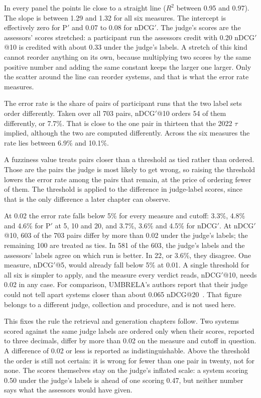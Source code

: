 In every panel the points lie close to a straight line ($R^2$ between 0.95 and 0.97).
The slope is between 1.29 and 1.32 for all six measures. The intercept is effectively
zero for P$'$ and 0.07 to 0.08 for nDCG$'$. The judge's scores are the assessors'
scores stretched: a participant run the assessors credit with 0.20 nDCG$'$@10 is
credited with about 0.33 under the judge's labels. A stretch of this kind cannot
reorder anything on its own, because multiplying two scores by the same positive
number and adding the same constant keeps the larger one larger. Only the scatter
around the line can reorder systems, and that is what the error rate measures.

The error rate is the share of pairs of participant runs that the two label sets
order differently. Taken over all 703 pairs, nDCG$'$@10 orders 54 of them
differently, or 7.7\%. That is close to the one pair in thirteen that the 2022 $\tau$
implied, although the two are computed differently. Across the six measures the rate
lies between 6.9\% and 10.1\%.

A fuzziness value treats pairs closer than a threshold as tied rather than ordered.
Those are the pairs the judge is most likely to get wrong, so raising the threshold
lowers the error rate among the pairs that remain, at the price of ordering fewer of
them. The threshold is applied to the difference in judge-label scores, since that is
the only difference a later chapter can observe.

At 0.02 the error rate falls below 5\% for every measure and cutoff: 3.3\%, 4.8\% and
4.6\% for P$'$ at 5, 10 and 20, and 3.7\%, 3.6\% and 4.5\% for nDCG$'$. At
nDCG$'$@10, 603 of the 703 pairs differ by more than 0.02 under the judge's labels;
the remaining 100 are treated as ties. In 581 of the 603, the judge's labels and the
assessors' labels agree on which run is better. In 22, or 3.6\%, they disagree. One
measure, nDCG$'$@5, would already fall below 5\% at 0.01. A single threshold for all
six is simpler to apply, and the measure every verdict reads, nDCG$'$@10, needs 0.02
in any case. For comparison, UMBRELA's authors report that their judge could not tell
apart systems closer than about 0.065 nDCG@20~\cite{upadhyay2025umbrela}. That figure
belongs to a different judge, collection and procedure, and is not used here.

This fixes the rule the retrieval and generation chapters follow. Two
systems scored against the same judge labels are ordered only when their scores,
reported to three decimals, differ by more than 0.02 on the measure and cutoff in
question. A difference of 0.02 or less is reported as indistinguishable. Above the
threshold the order is still not certain: it is wrong for fewer than one pair in
twenty, not for none. The scores themselves stay on the judge's inflated scale: a
system scoring 0.50 under the judge's labels is ahead of one scoring 0.47, but
neither number says what the assessors would have given.

